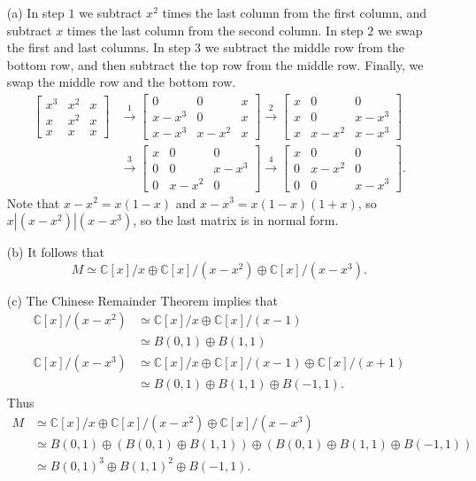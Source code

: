 \documentclass{amsart}
\newcommand{\bbm}       {\left[\begin{matrix}}
\newcommand{\ebm}       {\end{matrix}\right]}
\newcommand{\C}         {{\mathbb{C}}}
\newcommand{\xra}       {\xrightarrow}
\newcommand{\op}        {\oplus}
\renewcommand{\:}{\colon}
\theoremstyle{definition}
\renewenvironment{solution}{\SolutionAtEnd}{\endSolutionAtEnd}
\begin{document}
\begin{solution}
 \begin{itemize}
  \item[(a)]
   In step $1$ we subtract $x^2$ times the last column from the first
   column, and subtract $x$ times the last column from the second
   column.  In step $2$ we swap the first and last columns.  In step
   $3$ we subtract the middle row from the bottom row, and then
   subtract the top row from the middle row.  Finally, we swap the
   middle row and the bottom row.
   \begin{align*}
    \bbm  x^3 & x^2 & x \\ x & x^2 & x \\ x & x & x \ebm &\xra{1}
      \bbm  0 & 0 & x \\ x-x^3&0&x \\ x-x^3&x-x^2&x \ebm \xra{2}
      \bbm  x & 0 & 0 \\ x&0&x-x^3 \\ x&x-x^2&x-x^3 \ebm \\
      &\xra{3}
      \bbm  x & 0 & 0 \\ 0&0&x-x^3 \\ 0&x-x^2&0 \ebm \xra{4}
      \bbm  x & 0 & 0 \\ 0&x-x^2&0 \\ 0&0&x-x^3 \ebm.
   \end{align*}
   Note that $x-x^2=x(1-x)$ and $x-x^3=x(1-x)(1+x)$, so
   $x|(x-x^2)|(x-x^3)$, so the last matrix is in normal form.
  \item[(b)] It follows that 
   \[ M\simeq \C[x]/x\op \C[x]/(x-x^2) \op \C[x]/(x-x^3). \]
  \item[(c)] The Chinese Remainder Theorem implies that
   \begin{align*}
    \C[x]/(x-x^2) &\simeq \C[x]/x \op \C[x]/(x-1) \\
                  &\simeq B(0,1) \op B(1,1) \\
    \C[x]/(x-x^3) &\simeq \C[x]/x \op \C[x]/(x-1) \op \C[x]/(x+1) \\
                  &\simeq B(0,1) \op B(1,1) \op B(-1,1).
   \end{align*}
   Thus 
   \begin{align*}
    M &\simeq \C[x]/x\op \C[x]/(x-x^2) \op \C[x]/(x-x^3) \\
      &\simeq B(0,1) \op (B(0,1)\op B(1,1)) \op 
              (B(0,1) \op B(1,1) \op B(-1,1)) \\
      &\simeq B(0,1)^3 \op B(1,1)^2 \op B(-1,1).
   \end{align*}
 \end{itemize}
\end{solution}
\end{document}
